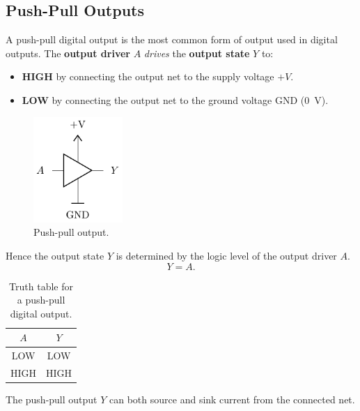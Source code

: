 \documentclass[a4paper]{report}
\begin{document}
\subsection{Push-Pull Outputs}
A push-pull digital output is the most common form of output used in digital outputs.
The \textbf{output driver} \(A\) \textit{drives} the \textbf{output state} \(Y\) to:
\begin{itemize}
    \item \textbf{HIGH} by connecting the output net to the supply voltage \(+\unit{V}\).
    \item \textbf{LOW} by connecting the output net to the ground voltage GND (\qty{0}{V}).
\end{itemize}
\begin{figure}[H]
    \centering
    \includegraphics[height = 4cm, keepaspectratio = true]{figures/push_pull.pdf}
    \caption{Push-pull output.} %
\end{figure}
Hence the output state \(Y\) is determined by the logic level of the output driver \(A\).
\begin{equation*}
    Y = A.
\end{equation*}
\begin{table}[H]
    \centering
    \begin{tabular}{c | c} %
        \toprule
        \textbf{\(A\)} & \textbf{\(Y\)} \\
        \midrule
        LOW            & LOW            \\
        HIGH           & HIGH           \\
        \bottomrule
    \end{tabular}
    \caption{Truth table for a push-pull digital output.} %
\end{table}
The push-pull output \(Y\) can both source and sink current from the connected net.
\end{document}
